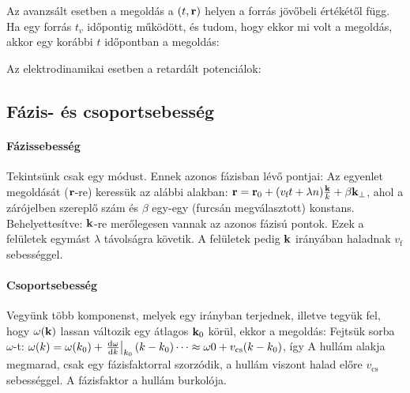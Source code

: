     Az avanzsált esetben a megoldás a $(t,\mathbf{r})$ helyen a forrás jövőbeli értékétől függ. Ha egy forrás $t_v$ időpontig működött, és tudom, hogy ekkor mi volt a megoldás, akkor egy korábbi $t$ időpontban a megoldás:
    
    Az elektrodinamikai esetben a retardált potenciálok:
    
  \subsection{Fázis- és csoportsebesség}
   
   \paragraph{Fázissebesség} Tekintsünk csak egy módust. Ennek azonos fázisban lévő pontjai:
   Az egyenlet megoldását ($\mathbf{r}$-re) keressük az alábbi alakban: $\mathbf{r}=\mathbf{r}_0+(v_\text{f} t + \lambda n)\frac{\mathbf{k}}{k}+\beta\mathbf{k}_{\perp}$, ahol a zárójelben szereplő szám  és $\beta$ egy-egy (furcsán megválasztott) konstans. Behelyettesítve:
   $\mathbf{k}$-re merőlegesen vannak az azonos fázisú pontok. Ezek a felületek egymást $\lambda$ távolságra követik. A felületek pedig $\mathbf{k}$ irányában haladnak $v_\text{f}$ sebességgel. 
   
   \paragraph{Csoportsebesség} Vegyünk több komponenst, melyek egy irányban terjednek, illetve tegyük fel, hogy $\omega(\mathbf{k})$ lassan változik egy átlagos $\mathbf{k}_0$ körül, ekkor a megoldás:
   Fejtsük sorba $\omega$-t: $\omega(k)=\omega(k_0)+\left.\frac{\mathrm{d} \omega}{\mathrm{d} k}\right|_{k_0}(k-k_0)\dots\approx\omega0+v_\text{cs}(k-k_0)$, így
   A hullám alakja megmarad, csak egy fázisfaktorral szorzódik, a hullám viszont halad előre $v_\text{cs}$ sebességgel. A fázisfaktor a hullám burkolója.
   
